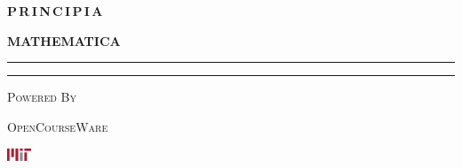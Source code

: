 \documentclass[./main]{subfiles}
\begin{document}
\begin{titlingpage}
\begin{center}
{      {\Huge \textbf{P\,R\,I\,N\,C\,I\,P\,I\,A}}
      
      \vspace{\parskip}

      {\huge \textbf{MATHEMATICA}}\\[\parskip]
      \rule{\textwidth}{\heavyrulewidth}
    }

    \vspace*{2em}

    {}

    \vfill

    {
      \color{MITgray}
      \rule{\textwidth}{\normalrulethickness}
      
      {\large \textsc{Powered By}}
    }
    
    \vspace*{1em}

    {\color{MITred} \textsc{OpenCourseWare}}

    \includegraphics[height = 1em]{images/MIT.pdf}
  \end{center}
\end{titlingpage}
\end{document}
